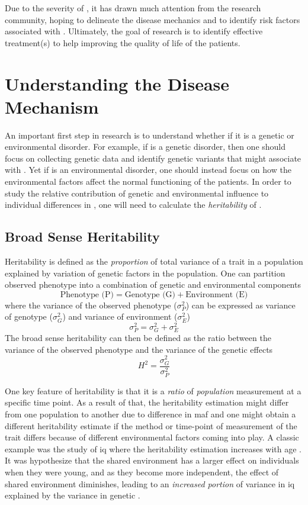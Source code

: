 	Due to the severity of , it has drawn much attention from the research community, hoping to delineate the disease mechanics and to identify risk factors associated with .
	Ultimately, the goal of  research is to identify effective treatment(s) to help improving the quality of life of the patients.
	
	\section{Understanding the Disease Mechanism}
	An important first step in  research is to understand whether if it is a genetic or environmental disorder. 
	For example, if  is a genetic disorder, then one should focus on collecting genetic data and identify genetic variants that might associate with .
	Yet if  is an environmental disorder, one should instead focus on how the environmental factors affect the normal functioning of the patients.
	In order to study the relative contribution of genetic and environmental influence to individual differences in , one will need to calculate the \emph{heritability} of .
	\subsection{Broad Sense Heritability}
	
	Heritability is defined as the \emph{proportion} of total variance of a trait in a population explained by variation of genetic factors in the population.
	One can partition observed phenotype into a combination of genetic and environmental components \citep{Falconer1996}
	$$
	\text{Phenotype (P)}=\text{Genotype (G)}+\text{Environment (E)}
	$$
	where the variance of the observed phenotype ($\sigma_P^2$) can be expressed as variance of genotype ($\sigma_G^2$) and variance of environment ($\sigma_E^2$)
	$$
	\sigma_P^2=\sigma_G^2+\sigma_E^2
	$$
	The broad sense heritability can then be defined as the ratio between the variance of the observed phenotype and the variance of the genetic effects
	$$
	H^2=\frac{\sigma_G^2}{\sigma_P^2}
	$$
	
	One key feature of heritability is that it is a \emph{ratio} of \emph{population} measurement at a specific time point.
	As a result of that, the heritability estimation might differ from one population to another due to difference in \gls{maf} and one might obtain a different heritability estimate if the method or time-point of measurement of the trait differs because of different environmental factors coming into play.
	A classic example was the study of \gls{iq} where the heritability estimation increases with age \citep{Bouchard2013}.
	It was hypothesize that the shared environment has a larger effect on individuals when they were young, and as they become more independent, the effect of shared environment diminishes, leading to an \emph{increased portion} of variance in \gls{iq} explained by the variance in genetic \citep{Bouchard2013}. 
	
